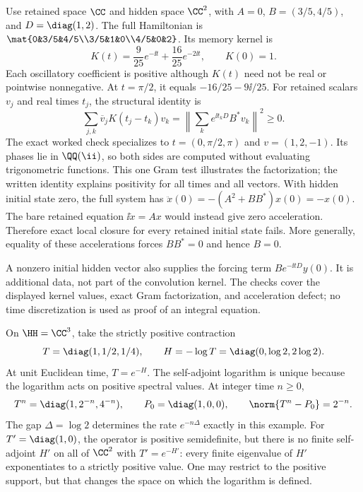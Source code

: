 Use retained space $\CC$ and hidden space $\CC^2$, with $A=0$, $B=(3/5,4/5)$, and $D=\diag(1,2)$. The full Hamiltonian is $\mat{0&3/5&4/5\\3/5&1&0\\4/5&0&2}$. Its memory kernel is
\[
K(t)=\frac9{25}e^{-\ii t}+\frac{16}{25}e^{-2\ii t},
\qquad K(0)=1.
\]
Each oscillatory coefficient is positive although $K(t)$ need not be real or pointwise nonnegative. At $t=\pi/2$, it equals $-16/25-9\ii/25$.
For retained scalars $v_j$ and real times $t_j$, the structural identity is
\[
\sum_{j,k}\overline v_jK(t_j-t_k)v_k
=\left\|\sum_k e^{\ii t_kD}B^*v_k\right\|^2\geq0.
\]
The exact worked check specializes to $t=(0,\pi/2,\pi)$ and $v=(1,2,-1)$. Its phases lie in $\QQ(\ii)$, so both sides are computed without evaluating trigonometric functions. This one Gram test illustrates the factorization; the written identity explains positivity for all times and all vectors.
With hidden initial state zero, the full system has $\ddot x(0)=-(A^2+BB^*)x(0)=-x(0)$. The bare retained equation $\ii\dot x=Ax$ would instead give zero acceleration. Therefore exact local closure for every retained initial state fails. More generally, equality of these accelerations forces $BB^*=0$ and hence $B=0$.

A nonzero initial hidden vector also supplies the forcing term $Be^{-\ii tD}y(0)$. It is additional data, not part of the convolution kernel. The checks cover the displayed kernel values, exact Gram factorization, and acceleration defect; no time discretization is used as proof of an integral equation.

On $\HH=\CC^3$, take the strictly positive contraction
\[
T=\diag(1,1/2,1/4),\qquad H=-\log T=\diag(0,\log2,2\log2).
\]
At unit Euclidean time, $T=e^{-H}$. The self-adjoint logarithm is unique because the logarithm acts on positive spectral values. At integer time $n\geq0$,
\[
T^n=\diag(1,2^{-n},4^{-n}),\qquad
P_0=\diag(1,0,0),\qquad\norm{T^n-P_0}=2^{-n}.
\]
The gap $\Delta=\log2$ determines the rate $e^{-n\Delta}$ exactly in this example.
For $T'=\diag(1,0)$, the operator is positive semidefinite, but there is no finite self-adjoint $H'$ on all of $\CC^2$ with $T'=e^{-H'}$: every finite eigenvalue of $H'$ exponentiates to a strictly positive value. One may restrict to the positive support, but that changes the space on which the logarithm is defined.


